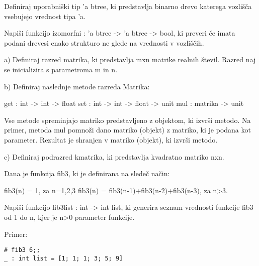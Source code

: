 \begin{ex}
\end{ex} \begin{ex}
Definiraj uporabni\v ski tip 'a btree, ki predstavlja binarno drevo katerega vozli\v s\v ca vsebujejo vrednost tipa 'a. 

Napi\v si funkcijo izomorfni : 'a btree -> 'a btree -> bool, ki preveri \v ce imata podani drevesi enako strukturo ne glede na vrednosti v vozli\v s\v cih.


\end{ex} \begin{ex}
a) Definiraj razred matrika, ki predstavlja mxn matrike realnih \v stevil. Razred naj se inicializira s parametroma m in n. 

b) Definiraj naslednje metode razreda Matrika:

  get : int -> int -> float
  set : int -> int -> float -> unit
  mul : matrika -> unit

  Vse metode spreminjajo matriko predstavljeno z objektom, ki izvr\v si metodo.
  Na primer, metoda mul pomno\v zi dano matriko (objekt) z matriko, ki je  podana kot 
    parameter. Rezultat je shranjen v matriko (objekt), ki izvr\v si metodo. 

c) Definiraj podrazred kmatrika, ki predstavlja kvadratno matriko nxn.


\end{ex} \begin{ex}
Dana je funkcija fib3, ki je definirana na slede\v c na\v cin:

fib3(n) = 1, za n=1,2,3
fib3(n) = fib3(n-1)+fib3(n-2)+fib3(n-3), za n>3.

Napi\v si funkcijo fib3list : int -> int list, ki generira seznam vrednosti funkcije fib3 od 1 do n, kjer je n>0 parameter funkcije. 


Primer:

\begin{verbatim}
# fib3 6;;
_ : int list = [1; 1; 1; 3; 5; 9]
\end{verbatim}

%
%
%

\end{ex} 

